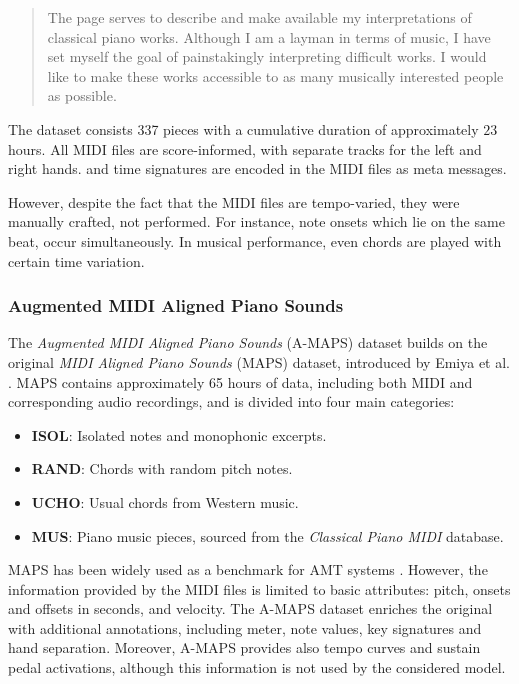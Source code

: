 \begin{quote}The page serves to describe and make available my interpretations of classical piano works. Although I am a layman in terms of music, I have set myself the goal of painstakingly interpreting difficult works. I would like to make these works accessible to as many musically interested people as possible.\end{quote}

The dataset consists 337 pieces with a cumulative duration of approximately $23$ hours. All MIDI files are score-informed, with separate tracks for the left and right hands.  and time signatures are encoded in the MIDI files as meta messages.

However, despite the fact that the MIDI files are tempo-varied, they were manually crafted, not performed. For instance, note onsets which lie on the same beat, occur simultaneously. In musical performance, even chords are played with certain time variation.

\subsubsection{Augmented MIDI Aligned Piano Sounds}

The \emph{Augmented MIDI Aligned Piano Sounds} (A-MAPS) dataset builds on the original \emph{MIDI Aligned Piano Sounds} (MAPS) dataset, introduced by Emiya et al. \cite{Emiya2010}. MAPS contains approximately 65 hours of data, including both MIDI and corresponding audio recordings, and is divided into four main categories:\begin{itemize}
	\item \textbf{ISOL}: Isolated notes and monophonic excerpts.
	\item \textbf{RAND}: Chords with random pitch notes.
	\item \textbf{UCHO}: Usual chords from Western music.
	\item \textbf{MUS}: Piano music pieces, sourced from the \emph{Classical Piano MIDI} database. \end{itemize}

MAPS has been widely used as a benchmark for AMT systems \cite{Ycart2018}. However, the information provided by the MIDI files is limited to basic attributes: pitch, onsets and offsets in seconds, and velocity. The A-MAPS dataset enriches the original with additional annotations, including meter, note values, key signatures and hand separation. Moreover, A-MAPS provides also tempo curves and sustain pedal activations, although this information is not used by the considered model.

